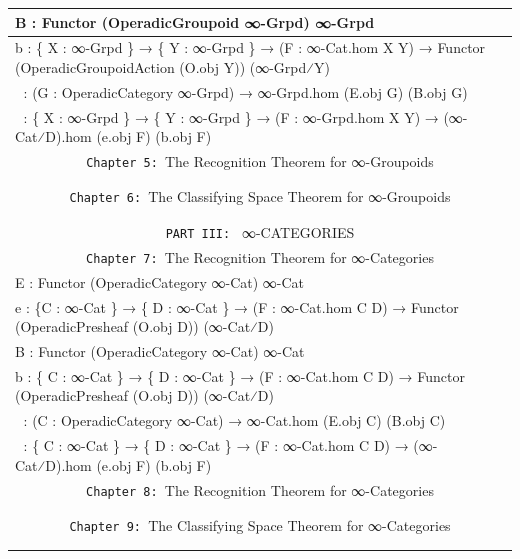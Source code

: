 \documentclass{book}
\theoremstyle{definition}
\begin{document}
{\begin{longtable}{|| l || l ||}
\hline
B⃡ : Functor (OperadicGroupoid ∞-Grpd) ∞-Grpd & \\
\hline
b⃡ : \{ X : ∞-Grpd \} → \{ Y : ∞-Grpd \} → (F : ∞-Cat.hom X Y) → Functor (OperadicGroupoidAction (O⃡.obj Y)) (∞-Grpd⁄Y) & \\
 \hline
∂⃡ : (G : OperadicCategory ∞-Grpd) → ∞-Grpd.hom (E⃡.obj G) (B⃡.obj G) & \\
\hline
∇⃡ : \{ X : ∞-Grpd \} → \{ Y : ∞-Grpd \} → (F : ∞-Grpd.hom X Y) → (∞-Cat⁄D).hom (e⃡.obj F) (b⃡.obj F) & \\
\hline \hline
\multicolumn{2}{||c||}{\texttt{Chapter 5: }The Recognition Theorem for ∞-Groupoids} \\
\hline \hline
 & \\
\hline
 & \\
\multicolumn{2}{||c||}{\texttt{Chapter 6: }The Classifying Space Theorem for ∞-Groupoids} \\
\hline \hline
 & \\
\hline
 & \\
\hline \hline
\multicolumn{2}{||c||}{\texttt{PART III: } ∞-CATEGORIES} \\
\hline \hline
\multicolumn{2}{||c||}{\texttt{Chapter 7: }The Recognition Theorem for ∞-Categories} \\
\hline \hline
E⃗ : Functor (OperadicCategory ∞-Cat) ∞-Cat  & \\ 
\hline
e⃗ : \{C : ∞-Cat \} → \{ D : ∞-Cat \} → (F : ∞-Cat.hom C D) → Functor (OperadicPresheaf (O⃗.obj D)) (∞-Cat⁄D) & \\
\hline
B⃗ : Functor (OperadicCategory ∞-Cat) ∞-Cat & \\
\hline
b⃗ : \{ C : ∞-Cat \} → \{ D : ∞-Cat \} → (F : ∞-Cat.hom C D) → Functor (OperadicPresheaf (O⃗.obj D)) (∞-Cat⁄D) & \\
 \hline
∂⃗ : (C : OperadicCategory ∞-Cat) → ∞-Cat.hom (E⃗.obj C) (B⃗.obj C) & \\
\hline
∇⃗ : \{ C : ∞-Cat \} → \{ D : ∞-Cat \} → (F : ∞-Cat.hom C D) → (∞-Cat⁄D).hom (e⃗.obj F) (b⃗.obj F) & \\
\hline \hline
\multicolumn{2}{||c||}{\texttt{Chapter 8: }The Recognition Theorem for ∞-Categories} \\
\hline \hline
 & \\
\hline
 & \\
\hline \hline
\multicolumn{2}{||c||}{\texttt{Chapter 9: }The Classifying Space Theorem for ∞-Categories} \\
\hline \hline
 & \\
\hline
 & \\
\hline \hline
\end{longtable}
}
\end{document}

